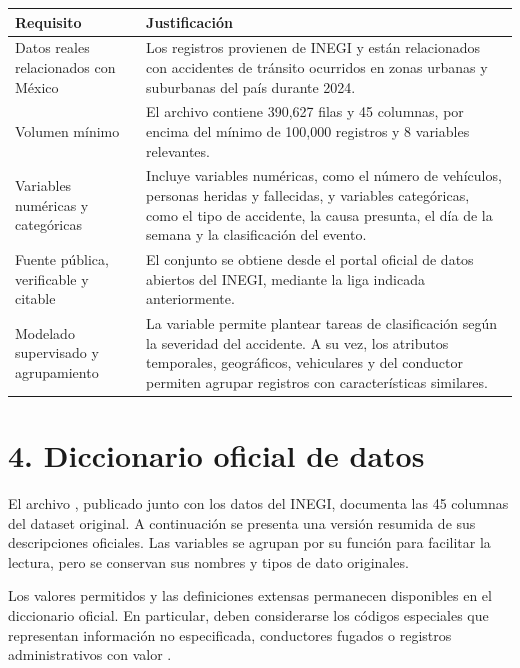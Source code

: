 \documentclass[11pt,letterpaper]{article}
\begin{document}
\begin{nota}
\vspace{0.25em}
\begin{tabularx}{\textwidth}{L{4.1cm}Y}
    \toprule
    \textbf{Requisito} & \textbf{Justificación} \\
    \midrule
    Datos reales relacionados con México
        & Los registros provienen de INEGI y están relacionados con accidentes
          de tránsito ocurridos en zonas urbanas y suburbanas del país durante
          2024. \\
    Volumen mínimo
        & El archivo  contiene 390,627 filas y 45
          columnas, por encima del mínimo de 100,000 registros y 8 variables
          relevantes. \\
    Variables numéricas y categóricas
        & Incluye variables numéricas, como el número de vehículos, personas
          heridas y fallecidas, y variables categóricas, como el tipo de
          accidente, la causa presunta, el día de la semana y la clasificación
          del evento. \\
    Fuente pública, verificable y citable
        & El conjunto se obtiene desde el portal oficial de datos abiertos del
          INEGI, mediante la liga indicada anteriormente. \\
    Modelado supervisado y agrupamiento
        & La variable  permite plantear tareas de clasificación
          según la severidad del accidente. A su vez, los atributos temporales,
          geográficos, vehiculares y del conductor permiten agrupar registros
          con características similares. \\
    \bottomrule
\end{tabularx}
\end{nota}

\newpage
\section*{4. Diccionario oficial de datos}

\begin{nota}
El archivo , publicado junto con
los datos del INEGI, documenta las 45 columnas del dataset original. A
continuación se presenta una versión resumida de sus descripciones oficiales.
Las variables se agrupan por su función para facilitar la lectura, pero se
conservan sus nombres y tipos de dato originales.

\vspace{0.4em}
Los valores permitidos y las definiciones extensas permanecen disponibles en el
diccionario oficial. En particular, deben considerarse los códigos especiales
que representan información no especificada, conductores fugados o registros
administrativos con valor .
\end{nota}
\end{document}
